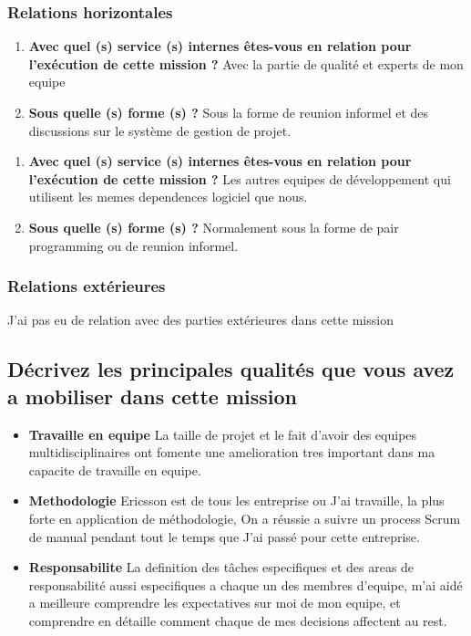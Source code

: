\documentclass{resume} %
\begin{document}
	\subsubsection {Relations horizontales}
	\begin{enumerate}
		\item \textbf{ Avec quel (s) service (s) internes êtes-vous en relation pour l'exécution de cette mission ?}
			Avec la partie de qualité et experts de mon equipe
		\item \textbf{Sous quelle (s) forme (s) ?}
			Sous la forme de reunion informel et des discussions sur le système de gestion de projet. 
	\end {enumerate}	
	\begin{enumerate}
		\item \textbf{ Avec quel (s) service (s) internes êtes-vous en relation pour l'exécution de cette mission ?}
			Les autres equipes de développement qui utilisent les memes dependences logiciel que nous. 
		\item \textbf{Sous quelle (s) forme (s) ?}
			Normalement sous la forme de pair programming ou de reunion informel.
	\end {enumerate}	

	\subsubsection {Relations extérieures}
		J'ai pas eu de relation avec des parties extérieures dans cette mission 
		
			
\subsection{Décrivez les principales qualités que vous avez a mobiliser dans cette mission}
	
		\begin{itemize} 				
			\item \textbf{Travaille en equipe} \newline
				La taille de projet et le fait d'avoir des equipes multidisciplinaires ont fomente une amelioration tres important dans ma capacite de travaille en equipe. 
			\item \textbf{Methodologie} \newline
				Ericsson est de tous les entreprise ou J'ai travaille, la plus forte en application de méthodologie, On a réussie a suivre un process Scrum de manual pendant tout le temps que J'ai passé pour cette entreprise.  
			\item \textbf{Responsabilite  } \newline
				La definition des tâches especifiques et des areas de responsabilité aussi especifiques a chaque un des membres  d'equipe, m'ai aidé a meilleure comprendre les expectatives sur moi de mon equipe, et comprendre en détaille comment chaque de mes decisions affectent au rest.  
		\end{itemize}
		
\end{document}

